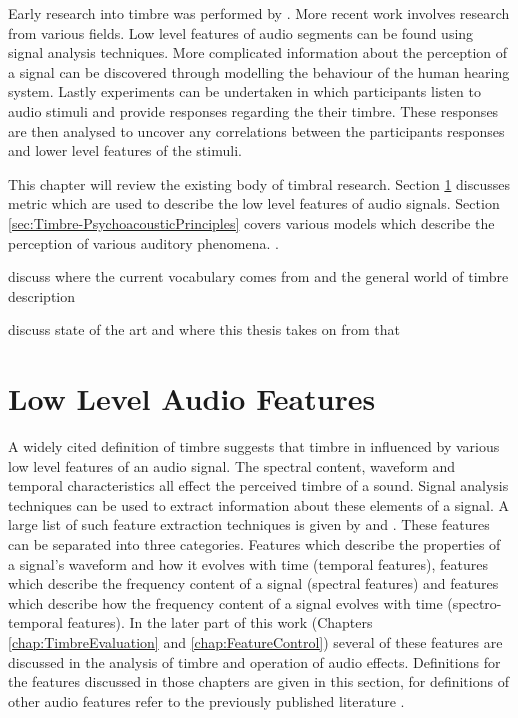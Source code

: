 	Early research into timbre was performed by \citet{helmholtz1875on}. More recent work involves research from
	various fields. Low level features of audio segments can be found using signal analysis techniques. More
	complicated information about the perception of a signal can be discovered through modelling the behaviour of the
	human hearing system. Lastly experiments can be undertaken in which participants listen to audio stimuli and
	provide responses regarding the their timbre. These responses are then analysed to uncover any correlations between
	the participants responses and lower level features of the stimuli.

	This chapter will review the existing body of timbral research. Section \ref{sec:Timbre-LowLevelFeatures} discusses
	metric which are used to describe the low level features of audio signals. Section
	\ref{sec:Timbre-PsychoacousticPrinciples} covers various models which describe the perception of various auditory
	phenomena. .

	\note
	{
		discuss where the current vocabulary comes from and the general world of timbre description

		discuss state of the art and where this thesis takes on from that
	}

\section{Low Level Audio Features}
\label{sec:Timbre-LowLevelFeatures}
	A widely cited definition of timbre \citep{ASA1960american} suggests that timbre in influenced by various low level
	features of an audio signal. The spectral content, waveform and temporal characteristics all effect the perceived
	timbre of a sound. Signal analysis techniques can be used to extract information about these elements of a signal.
	A large list of such feature extraction techniques is given by \citet{peeters2004a} and
	\citet{bullock2008implementing}. These features can be separated into three categories. Features which describe the
	properties of a signal's waveform and how it evolves with time (temporal features), features which describe the
	frequency content of a signal (spectral features) and features which describe how the frequency content of a signal
	evolves with time (spectro-temporal features). In the later part of this work (Chapters \ref{chap:TimbreEvaluation}
	and \ref{chap:FeatureControl}) several of these features are discussed in the analysis of timbre and operation of
	audio effects. Definitions for the features discussed in those chapters are given in this section, for definitions
	of other audio features refer to the previously published literature \citep{peeters2004a, bullock2008implementing}.

